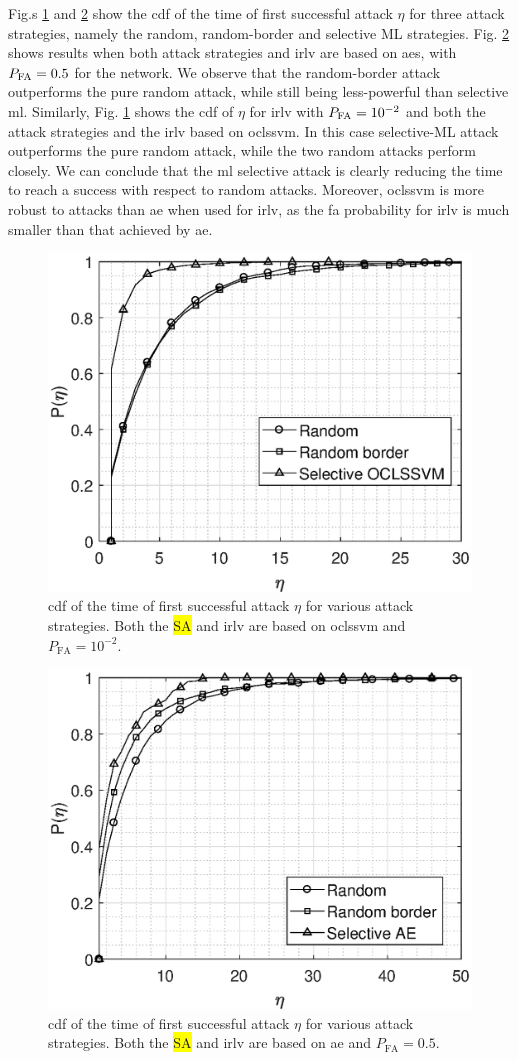\documentclass[draftcls,onecolumn,12pt]{IEEEtran}
\begin{document}
Fig.s \ref{fig:selectiveSVM} and \ref{fig:selectiveAE} show the \ac{cdf} of the time of first successful attack $\eta$ for three attack strategies, namely the random, random-border and selective ML strategies. Fig. \ref{fig:selectiveAE} shows results when both attack strategies and \ac{irlv} are based on \acp{ae}, with $P_{\rm FA} =0.5$ for the network. We observe that the random-border attack outperforms the pure random attack, while still being less-powerful than selective \ac{ml}. Similarly, Fig. \ref{fig:selectiveSVM} shows the \ac{cdf} of $\eta$ for \ac{irlv} with $P_{\rm FA}=10^{-2}$ and both the attack strategies and the \ac{irlv} based on \ac{oclssvm}. In this case selective-ML attack outperforms the pure random attack, while the two random attacks perform closely. We can conclude that the \ac{ml} selective attack is clearly reducing the time to reach a success with respect to random attacks. Moreover, \ac{oclssvm} is more robust to attacks than \ac{ae} when used for \ac{irlv}, as the \ac{fa} probability for \ac{irlv} is much smaller than that achieved by \ac{ae}.



\begin{figure}[t]
    \centering
    \includegraphics[width=0.6\columnwidth]{res_selective_SVM.eps}
    \caption{\ac{cdf} of the time of first successful attack $\eta$ for various attack strategies. Both the \colorbox{yellow}{SA} and \ac{irlv} are based on \ac{oclssvm} and $P_{\text{FA}}= 10^{-2}$.}
    \label{fig:selectiveSVM}
\end{figure}

\begin{figure}[t]
    \centering
    \includegraphics[width=0.6\columnwidth]{res_selective_AE.eps}
    \caption{\ac{cdf} of the time of first successful attack $\eta$ for various attack strategies. Both the \colorbox{yellow}{SA} and \ac{irlv} are based on \ac{ae} and $P_{\text{FA}}= 0.5$.}
    \label{fig:selectiveAE}
\end{figure}
\end{document}
